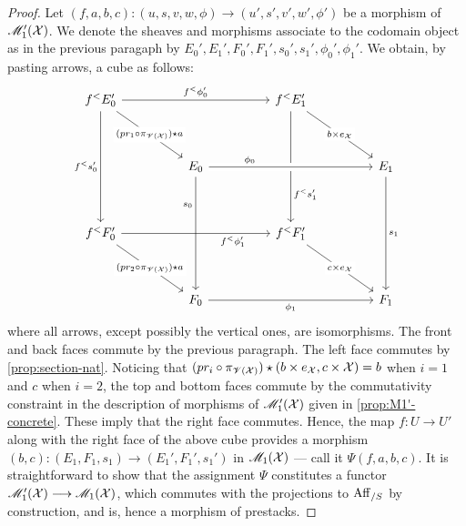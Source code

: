 \documentclass[11pt]{amsart}
\begin{document}
\begin{proof}
Let $(f, a, b, c) : (u, s, v, w, \phi) \to (u', s', v', w', \phi')$
be a morphism of $\mathscr{M}_1'(\mathcal{X})$. We denote the sheaves and morphisms associate
to the codomain object as in the previous paragaph by $E_0', E_1', F_0', F_1',
s_0', s_1', \phi_0', \phi_1'$. We obtain, by pasting arrows, a cube as follows:
\begin{equation}\label{eqn:arr-bun-arr-sec-equiv-cube}
\begin{tikzcd}[row sep=huge, column sep=huge]
f^<E_0'
  \ar[rr, "f^<\phi_0'"]
  \ar[dd, "f^<s_0'" left]
  \ar[rd, "(pr_1 \circ \pi_{\sV(\mcX)}) \star a" description] & &
f^<E_1'
  \ar[rd, "b \times e_\mcX" description]
  \ar[dd, "f^<s_1'" near end] & \\ &
E_0
  \ar[dd, "s_0" left, near start]
  \ar[rr, crossing over, "\phi_0" near start] & &
E_1
  \ar[dd, "s_1"] \\
f^<F_0'
  \ar[rd, "(pr_2 \circ \pi_{\sV(\mcX)}) \star a" description]
  \ar[rr, "f^<\phi_1'" below, near end] & &
f^<F_1'
  \ar[rd, "c \times e_\mcX" description] & \\ &
F_0
  \ar[rr, "\phi_1" below] & &
F_1
\end{tikzcd}
\end{equation}
where all arrows, except possibly the vertical ones, are isomorphisms.
The front and back faces commute by the previous paragraph. The left face commutes
by \cref{prop:section-nat}. Noticing that
$(pr_i \circ \pi_{\mathscr{V}(\mathcal{X})}) \star (b \times e_\mathcal{X}, c \times \mathcal{X}) = b$
when $i = 1$ and $c$ when $i = 2$, the top and bottom faces commute by the
commutativity constraint in the description of morphisms of $\mathscr{M}_1'(\mathcal{X})$ given in
\cref{prop:M1'-concrete}. These imply that the right face commutes.
Hence, the map $f : U \to U'$ along with the right face of the above
cube provides a morphism
$(b, c) : (E_1, F_1, s_1) \to (E_1', F_1', s_1')$ in $\mathscr{M}_1(\mathcal{X})$
--- call it $\Psi(f, a, b, c)$.
It is straightforward to show that the assignment $\Psi$ constitutes a functor
$\sM_1'(\mcX) \to \sM_1(\mcX)$, which commutes with the projections to
$\mathrm{Aff}_{/S}$ by construction, and is, hence a morphism of prestacks.


\end{proof}
\end{document}
